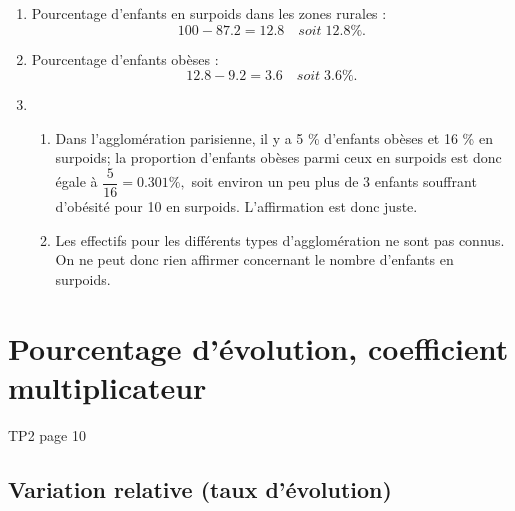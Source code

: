 \documentclass[12pt,a4paper]{article}
\begin{document}
\begin{enumerate}[label=\arabic*. ]
	\item  Pourcentage d'enfants en surpoids dans les zones rurales :
	\begin{equation*}
		\num{100} - \num{87.2} = \num{12.8} \quad soit \; \num{12.8} \%.
	\end{equation*}
	
	\medskip 
	
	\item  Pourcentage d'enfants obèses :
	\begin{equation*}
		\num{12.8} - \num{9.2} = \num{3.6} \quad soit \; \num{3.6} \%.
	\end{equation*}
	
	\item \begin{enumerate}[label=\alph*)]
		\item Dans l'agglomération parisienne, il y a \num{5} \% d'enfants obèses et \num{16} \% en surpoids; la proportion d'enfants obèses parmi ceux en surpoids est donc égale à $\dfrac{5}{16}=\num{0.301} \%,$ soit environ un peu plus de 3 enfants souffrant d'obésité pour 10 en surpoids. L'affirmation est donc juste.
		
		\item Les effectifs pour les différents types d'agglomération ne sont pas connus. On ne peut donc rien affirmer concernant le nombre d'enfants en surpoids.
	\end{enumerate}
	
	
\end{enumerate}

\section{Pourcentage d'évolution, coefficient multiplicateur}

TP2 page 10

\subsection{Variation relative (taux d'évolution)}
\end{document}
